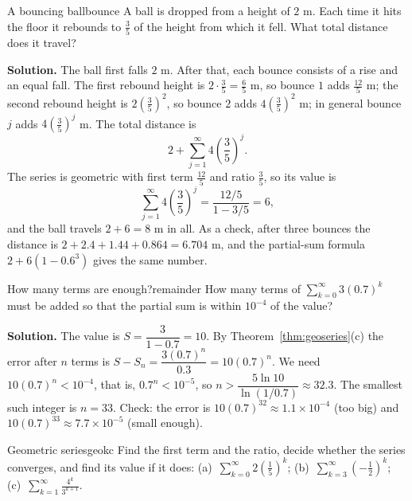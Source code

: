 \documentclass[11pt]{article}
\begin{document}
\begin{exmp}{A bouncing ball}{bounce}
A ball is dropped from a height of $2$ m. Each time it hits the floor it rebounds to $\frac35$ of the height from which it fell. What total distance does it travel?

\textbf{Solution.} The ball first falls $2$ m. After that, each bounce consists of a rise and an equal fall. The first rebound height is $2\cdot\frac35=\frac65$ m, so bounce $1$ adds $\frac{12}5$ m; the second rebound height is $2\left(\frac35\right)^2$, so bounce $2$ adds $4\left(\frac35\right)^2$ m; in general bounce $j$ adds $4\left(\frac35\right)^j$ m. The total distance is
\[
2+\sum_{j=1}^\infty4\left(\frac35\right)^j .
\]
The series is geometric with first term $\frac{12}5$ and ratio $\frac35$, so its value is
\[
\sum_{j=1}^\infty4\left(\frac35\right)^j=\frac{12/5}{1-3/5}=6 ,
\]
and the ball travels $2+6=8$ m in all. As a check, after three bounces the distance is $2+2.4+1.44+0.864=6.704$ m, and the partial-sum formula $2+6\left(1-0.6^3\right)$ gives the same number.
\end{exmp}

\begin{exmp}{How many terms are enough?}{remainder}
How many terms of $\displaystyle\sum_{k=0}^\infty3(0.7)^k$ must be added so that the partial sum is within $10^{-4}$ of the value?

\textbf{Solution.} The value is $S=\dfrac{3}{1-0.7}=10$. By Theorem~\ref{thm:geoseries}(c) the error after $n$ terms is $S-S_n=\dfrac{3(0.7)^n}{0.3}=10(0.7)^n$. We need $10(0.7)^n<10^{-4}$, that is, $0.7^n<10^{-5}$, so $n>\dfrac{5\ln10}{\ln(1/0.7)}\approx32.3$. The smallest such integer is $n=33$. Check: the error is $10(0.7)^{32}\approx1.1\times10^{-4}$ (too big) and $10(0.7)^{33}\approx7.7\times10^{-5}$ (small enough).
\end{exmp}

\begin{kc}{Geometric series}{geokc}
Find the first term and the ratio, decide whether the series converges, and find its value if it does: (a)~$\displaystyle\sum_{k=0}^\infty2\left(\frac15\right)^k$; \quad (b)~$\displaystyle\sum_{k=3}^\infty\left(-\frac12\right)^k$; \quad (c)~$\displaystyle\sum_{k=1}^\infty\frac{4^k}{3^{k+1}}$.
\end{kc}
\end{document}

